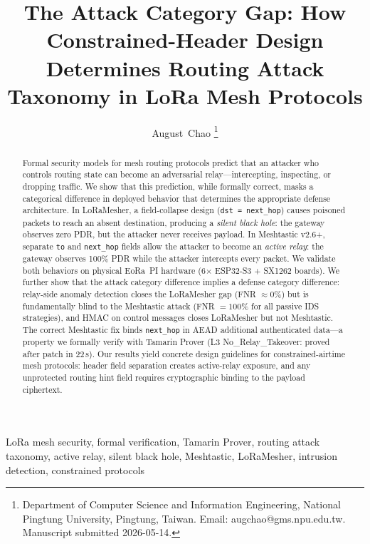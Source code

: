 \documentclass[journal]{IEEEtran}
\begin{document}
\title{The Attack Category Gap: How Constrained-Header Design Determines
       Routing Attack Taxonomy in LoRa Mesh Protocols}

\author{August~Chao%
\thanks{Department of Computer Science and Information Engineering,
National Pingtung University, Pingtung, Taiwan.
Email: augchao@gms.npu.edu.tw.
Manuscript submitted 2026-05-14.}}


\maketitle

\begin{abstract}
Formal security models for mesh routing protocols predict that an attacker
who controls routing state can become an adversarial relay---intercepting,
inspecting, or dropping traffic. We show that this prediction, while formally
correct, masks a categorical difference in deployed behavior that determines
the appropriate defense architecture. In LoRaMesher, a field-collapse design
(\texttt{dst = next\_hop}) causes poisoned packets to reach an absent
destination, producing a \emph{silent black hole}: the gateway observes
zero PDR, but the attacker never receives payload. In Meshtastic v2.6+,
separate \texttt{to} and \texttt{next\_hop} fields allow the attacker to
become an \emph{active relay}: the gateway observes 100\% PDR while the
attacker intercepts every packet. We validate both behaviors on physical
EoRa~PI hardware (6$\times$ ESP32-S3 + SX1262 boards). We further show that
the attack category difference implies a defense category difference:
relay-side anomaly detection closes the LoRaMesher gap (FNR $\approx 0$\%)
but is fundamentally blind to the Meshtastic attack (FNR $= 100$\% for all
passive IDS strategies), and HMAC on control messages closes LoRaMesher but
not Meshtastic. The correct Meshtastic fix binds \texttt{next\_hop} in AEAD
additional authenticated data---a property we formally verify with Tamarin
Prover (L3 No\_Relay\_Takeover: proved after patch in 22\,s). Our results
yield concrete design guidelines for constrained-airtime mesh protocols:
header field separation creates active-relay exposure, and any unprotected
routing hint field requires cryptographic binding to the payload ciphertext.
\end{abstract}

\begin{IEEEkeywords}
LoRa mesh security, formal verification, Tamarin Prover, routing attack
taxonomy, active relay, silent black hole, Meshtastic, LoRaMesher,
intrusion detection, constrained protocols
\end{IEEEkeywords}
\end{document}
